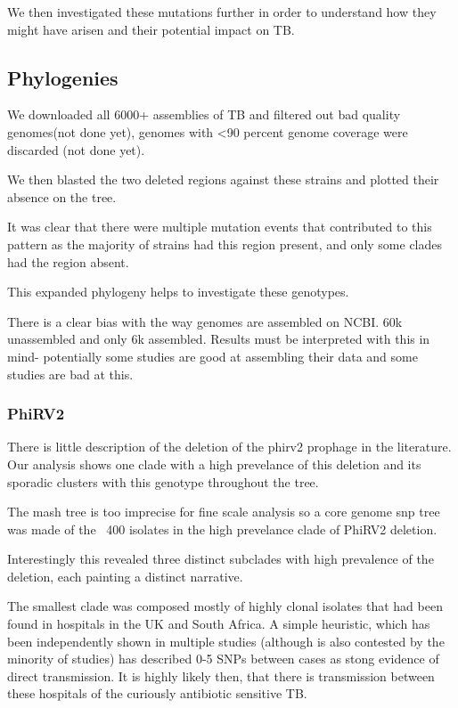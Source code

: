 We then investigated these mutations further in order to understand how they might have arisen and their potential impact on TB.
\subsection{Phylogenies}
We downloaded all 6000+ assemblies of TB and filtered out bad quality genomes(not done yet), genomes with <90 percent genome coverage were discarded (not done yet).

We then blasted the two deleted regions against these strains and plotted their absence on the tree.

It was clear that there were multiple mutation events that contributed to this pattern as the majority of strains had this region present, and only some clades had the region absent.

This expanded phylogeny helps to investigate these genotypes.

There is a clear bias with the way genomes are assembled on NCBI. 60k unassembled and only 6k assembled. Results must be interpreted with this in mind- potentially some studies are good at assembling their data and some studies are bad at this.

\subsubsection{PhiRV2}

There is little description of the deletion of the phirv2 prophage in the literature. Our analysis shows one clade with a high prevelance of this deletion and its sporadic clusters with this genotype throughout the tree.

The mash tree is too imprecise for fine scale analysis so a core genome snp tree was made of the ~400 isolates in the high prevelance clade of PhiRV2 deletion. 

Interestingly this revealed three distinct subclades with high prevalence of the deletion, each painting a distinct narrative.

The smallest clade was composed mostly of highly clonal isolates that had been found in hospitals in the UK and South Africa. A simple heuristic, which has been independently shown in multiple studies (although is also contested by the minority of studies) has described 0-5 SNPs between cases as stong evidence of direct transmission. It is highly likely then, that there is transmission between these hospitals of the curiously antibiotic sensitive TB.

